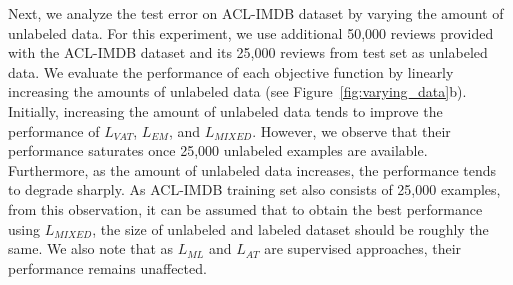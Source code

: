 \documentclass[letterpaper]{article}
\begin{document}
Next, we analyze the test error on ACL-IMDB dataset by varying the amount of unlabeled data. For this experiment, we use additional 50,000 reviews provided with the ACL-IMDB dataset and its 25,000 reviews from test set as unlabeled data. We evaluate the performance of each objective function by linearly increasing the amounts of unlabeled data (see Figure~\ref{fig:varying_data}b). Initially, increasing the amount of unlabeled data tends to improve the performance of $L_{\textit{VAT}}$, $L_{\textit{EM}}$, and $L_{\textit{MIXED}}$. However, we observe that their performance saturates once 25,000 unlabeled examples are available. Furthermore, as the amount of unlabeled data increases, the performance tends to degrade sharply. As ACL-IMDB training set also consists of 25,000 examples, from this observation, it can be assumed that to obtain the best performance using $L_{\textit{MIXED}}$, the size of unlabeled and labeled dataset should be roughly the same. We also note that as $L_{\textit{ML}}$ and $L_{\textit{AT}}$ are supervised approaches, their performance remains unaffected.
\end{document}
